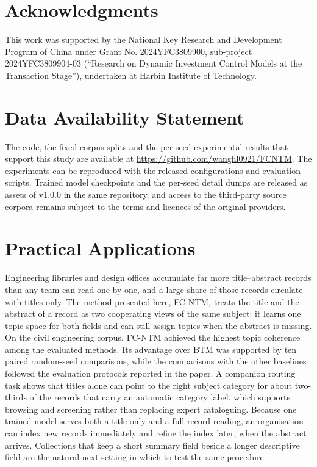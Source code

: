 \documentclass[Journal,letterpaper,NoLists]{ascelike-new}
\begin{document}
\section{Acknowledgments}

This work was supported by the National Key Research and Development Program of China under
Grant No. 2024YFC3809900, sub-project 2024YFC3809904-03 (``Research on Dynamic Investment
Control Models at the Transaction Stage''), undertaken at Harbin Institute of Technology.

\section{Data Availability Statement}

The code, the fixed corpus splits and the per-seed experimental results that support this study are
available at \url{https://github.com/wanghl0921/FCNTM}. The experiments can be reproduced with the
released configurations and evaluation scripts. Trained model checkpoints and the per-seed detail
dumps are released as assets of v1.0.0 in the same repository, and access to the third-party source
corpora remains subject to the terms and licences of the original providers.

\section{Practical Applications}

Engineering libraries and design offices accumulate far more title--abstract records than any team
can read one by one, and a large share of those records circulate with titles only. The method
presented here, FC-NTM, treats the title and the abstract of a record as two cooperating views of
the same subject: it learns one topic space for both fields and can still assign topics when the
abstract is missing. On the civil engineering corpus, FC-NTM achieved the highest topic coherence
among the evaluated methods. Its advantage over BTM was supported by ten paired random-seed
comparisons, while the comparisons with the other baselines followed the evaluation protocols
reported in the paper. A companion routing task shows
that titles alone can point to the right subject category for about two-thirds of the records
that carry an automatic category label, which supports browsing and screening rather than
replacing expert cataloguing. Because one trained model serves both a title-only and a
full-record reading, an organisation can index new records immediately and refine the index
later, when the abstract arrives. Collections that keep a short summary field beside a longer
descriptive field are the natural next setting in which to test the same procedure.
\end{document}
